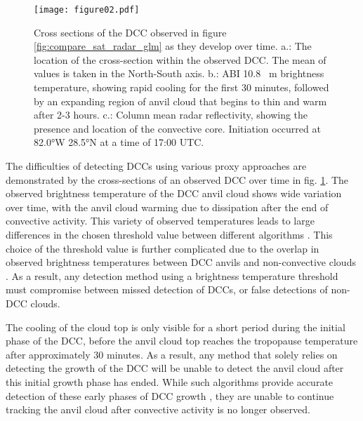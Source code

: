 \begin{figure}[t]
    \texttt{[image: figure02.pdf]}
    \caption{Cross sections of the DCC observed in figure \ref{fig:compare_sat_radar_glm} as they develop over time. a.: The location of the cross-section within the observed DCC. The mean of values is taken in the North-South axis. b.: ABI 10.8 \unit{\mu m} brightness temperature, showing rapid cooling for the first 30 minutes, followed by an expanding region of anvil cloud that begins to thin and warm after 2-3 hours. c.: Column mean radar reflectivity, showing the presence and location of the convective core. Initiation occurred at 82.0°W 28.5°N at a time of 17:00 UTC.}
    \label{fig:dcc_over_time}
\end{figure}

The difficulties of detecting DCCs using various proxy approaches are demonstrated by the cross-sections of an observed DCC over time in fig. \ref{fig:dcc_over_time}.
The observed brightness temperature of the DCC anvil cloud shows wide variation over time, with the anvil cloud warming due to dissipation after the end of convective activity.
This variety of observed temperatures leads to large differences in the chosen threshold value between different algorithms \citep[see discussion in][]{bennartz_convective_2012}.
This choice of the threshold value is further complicated due to the overlap in observed brightness temperatures between DCC anvils and non-convective clouds \citep{konduru_new_2013}.
As a result, any detection method using a brightness temperature threshold must compromise between missed detection of DCCs, or false detections of non-DCC clouds.

The cooling of the cloud top is only visible for a short period during the initial phase of the DCC, before the anvil cloud top reaches the tropopause temperature after approximately 30 minutes.
As a result, any method that solely relies on detecting the growth of the DCC will be unable to detect the anvil cloud after this initial growth phase has ended.
While such algorithms provide accurate detection of these early phases of DCC growth \citep{zinner_validation_2013}, they are unable to continue tracking the anvil cloud after convective activity is no longer observed.

